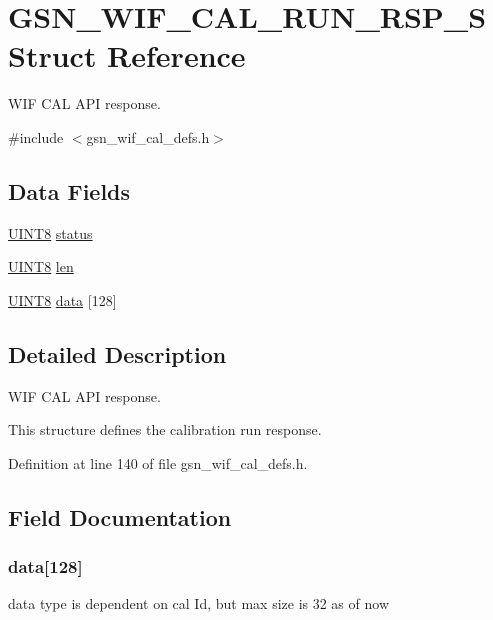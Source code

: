 \hypertarget{a00320}{
\section{GSN\_\-WIF\_\-CAL\_\-RUN\_\-RSP\_\-S Struct Reference}
\label{a00320}
}


WIF CAL API response.  




{\ttfamily \#include $<$gsn\_\-wif\_\-cal\_\-defs.h$>$}

\subsection*{Data Fields}
\begin{DoxyCompactItemize}
\item 
\hyperlink{a00660_gab27e9918b538ce9d8ca692479b375b6a}{UINT8} \hyperlink{a00320_ac4f6d5d1544a8d2c1309479ffe1b61ab}{status}
\item 
\hyperlink{a00660_gab27e9918b538ce9d8ca692479b375b6a}{UINT8} \hyperlink{a00320_a197a42ec85f4898bd19c17b05bc07d81}{len}
\item 
\hyperlink{a00660_gab27e9918b538ce9d8ca692479b375b6a}{UINT8} \hyperlink{a00320_a41f52460eec8cab484a388d99193b952}{data} \mbox{[}128\mbox{]}
\end{DoxyCompactItemize}


\subsection{Detailed Description}
WIF CAL API response. 

This structure defines the calibration run response. 

Definition at line 140 of file gsn\_\-wif\_\-cal\_\-defs.h.



\subsection{Field Documentation}
\hypertarget{a00320_a41f52460eec8cab484a388d99193b952}{
\subsubsection[{data}]{ {\bf data}\mbox{[}128\mbox{]}}}
\label{a00320_a41f52460eec8cab484a388d99193b952}
data type is dependent on cal Id, but max size is 32 as of now 


